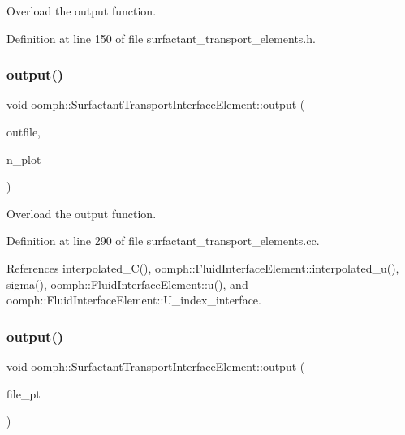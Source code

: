Overload the output function. 



Definition at line 150 of file surfactant\+\_\+transport\+\_\+elements.\+h.

\mbox{\label{classoomph_1_1SurfactantTransportInterfaceElement_aebc3ed4954b636f4992a212c7973c670}} 
\subsubsection{\texorpdfstring{output()}{output()}\hspace{0.1cm}{\footnotesize\ttfamily [2/4]}}
{\footnotesize\ttfamily void oomph\+::\+Surfactant\+Transport\+Interface\+Element\+::output (\begin{DoxyParamCaption}\item[{std\+::ostream \&}]{outfile,  }\item[{const unsigned \&}]{n\+\_\+plot }\end{DoxyParamCaption})}



Overload the output function. 



Definition at line 290 of file surfactant\+\_\+transport\+\_\+elements.\+cc.



References interpolated\+\_\+\+C(), oomph\+::\+Fluid\+Interface\+Element\+::interpolated\+\_\+u(), sigma(), oomph\+::\+Fluid\+Interface\+Element\+::u(), and oomph\+::\+Fluid\+Interface\+Element\+::\+U\+\_\+index\+\_\+interface.

\mbox{\label{classoomph_1_1SurfactantTransportInterfaceElement_a32ae151a017b122dd7a4c03511afbcc9}} 
\subsubsection{\texorpdfstring{output()}{output()}\hspace{0.1cm}{\footnotesize\ttfamily [3/4]}}
{\footnotesize\ttfamily void oomph\+::\+Surfactant\+Transport\+Interface\+Element\+::output (\begin{DoxyParamCaption}\item[{F\+I\+LE $\ast$}]{file\+\_\+pt }\end{DoxyParamCaption})\hspace{0.3cm}{\ttfamily [inline]}}



